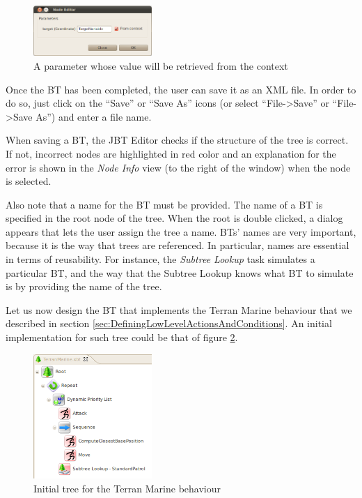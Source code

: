 \documentclass[a4paper]{article}
\begin{document}
\begin{figure}
 \centering
 \includegraphics[width=0.4\textwidth]{./Images/ParameterFromContext.png}
 \caption{A parameter whose value will be retrieved from the context}
 \label{fig:ParameterFromContext}
\end{figure}

Once the BT has been completed, the user can save it as an XML file. In order to do so, just click on the ``Save'' or ``Save As'' icons (or select ``File->Save'' or ``File->Save As'') and enter a file name.

When saving a BT, the JBT Editor checks if the structure of the tree is correct. If not, incorrect nodes are highlighted in red color and an explanation for the error is shown in the \textit{Node Info} view (to the right of the window) when the node is selected.

Also note that a name for the BT must be provided. The name of a BT is specified in the root node of the tree. When the root is double clicked, a dialog appears that lets the user assign the tree a name. BTs' names are very important, because it is the way that trees are referenced. In particular, names are essential in terms of reusability. For instance, the \textit{Subtree Lookup} task simulates a particular BT, and the way that the Subtree Lookup knows what BT to simulate is by providing the name of the tree.

Let us now design the BT that implements the Terran Marine behaviour that we described in section \ref{sec:DefiningLowLevelActionsAndConditions}. An initial implementation for such tree could be that of figure \ref{fig:InitialTerranMarineBT}. 

\begin{figure}
 \centering
 \includegraphics[width=0.4\textwidth]{./Images/InitialTerranMarineBT.png}
 \caption{Initial tree for the Terran Marine behaviour}
 \label{fig:InitialTerranMarineBT}
\end{figure}
\end{document}
